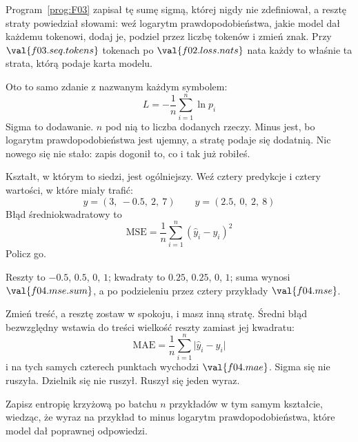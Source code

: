 \begin{fr}
Program~\ref{prog:F03} zapisał tę sumę sigmą, której nigdy nie zdefiniował, a
resztę straty powiedział słowami: weź logarytm prawdopodobieństwa, jakie model
dał każdemu tokenowi, dodaj je, podziel przez liczbę tokenów i zmień znak. Przy
$\val{f03.seq.tokens}$ tokenach po $\val{f02.loss.nats}$ nata każdy to
właśnie ta strata, którą podaje karta modelu.

Oto to samo zdanie z nazwanym każdym symbolem:
\[ L = -\frac{1}{n}\sum_{i=1}^{n} \ln p_i \]
Sigma to dodawanie. $n$ pod nią to liczba dodanych rzeczy. Minus jest, bo
logarytm prawdopodobieństwa jest ujemny, a stratę podaje się dodatnią. Nic
nowego się nie stało: zapis dogonił to, co i tak już robiłeś.

Kształt, w którym to siedzi, jest ogólniejszy. Weź cztery predykcje i cztery
wartości, w które miały trafić:
\[ y = (3,\ -\num{0.5},\ 2,\ 7) \qquad
   \hat{y} = (\num{2.5},\ 0,\ 2,\ 8) \]
Błąd średniokwadratowy to
\[ \mathrm{MSE} = \frac{1}{n}\sum_{i=1}^{n} (\hat{y}_i - y_i)^{2} \]
Policz go.
\nextframe
\end{fr}

\begin{fr}
\begin{ansblock}
Reszty to $-\num{0.5}$, $\num{0.5}$, $0$, $1$; kwadraty to $\num{0.25}$,
$\num{0.25}$, $0$, $1$; suma wynosi $\val{f04.mse.sum}$, a po podzieleniu
przez cztery przykłady $\val{f04.mse}$.
\end{ansblock}

Zmień treść, a resztę zostaw w spokoju, i masz inną stratę. Średni błąd
bezwzględny wstawia do treści wielkość reszty zamiast jej kwadratu:
\[ \mathrm{MAE} = \frac{1}{n}\sum_{i=1}^{n} \lvert \hat{y}_i - y_i \rvert \]
i na tych samych czterech punktach wychodzi $\val{f04.mae}$. Sigma się nie
ruszyła. Dzielnik się nie ruszył. Ruszył się jeden wyraz.

\yourturn
Zapisz entropię krzyżową po batchu $n$ przykładów w tym samym kształcie,
wiedząc, że wyraz na przykład to minus logarytm prawdopodobieństwa, które
model dał poprawnej odpowiedzi.
\dotline
\nextframe
\end{fr}

